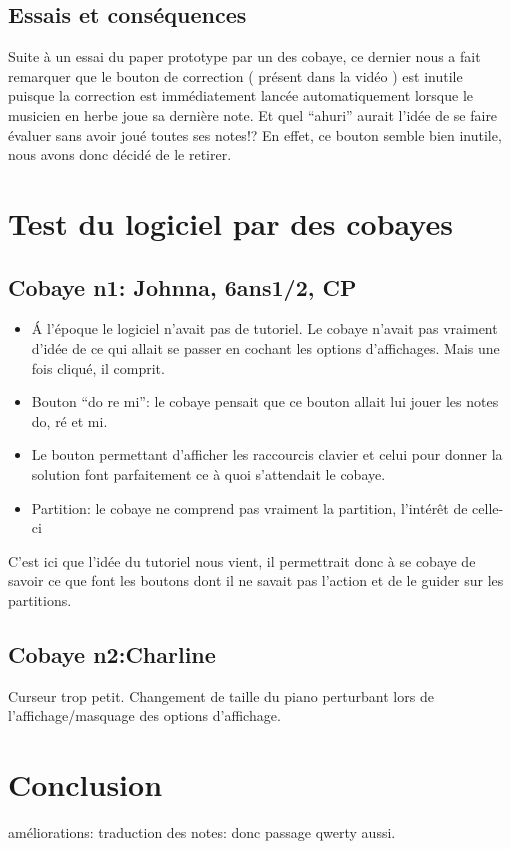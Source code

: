 \documentclass{article}
\begin{document}
\subsection{Essais et conséquences}
Suite à un essai du paper prototype par un des cobaye, ce dernier nous a fait remarquer que le bouton de correction ( présent dans la vidéo )
est inutile puisque la correction est immédiatement lancée automatiquement lorsque le musicien en herbe joue sa dernière note. Et 
quel ``ahuri'' aurait l'idée de se faire évaluer sans avoir joué toutes ses notes!?
En effet, ce bouton semble bien inutile, nous avons donc décidé de le retirer.
\section{Test du logiciel par des cobayes}
\subsection{Cobaye n1: Johnna, 6ans1/2, CP}

\begin{itemize}
\item \'A l'époque le logiciel n'avait pas de tutoriel. Le cobaye n'avait pas vraiment d'idée de ce qui allait se passer en cochant les 
options d'affichages. Mais une fois cliqué, il comprit.
\item Bouton ``do re mi'': le cobaye pensait que ce bouton allait lui jouer les notes do, ré et mi.
\item Le bouton permettant d'afficher les raccourcis clavier et celui pour donner la solution font parfaitement ce à quoi s'attendait
le cobaye.
\item Partition: le cobaye ne comprend pas vraiment la partition, l'intérêt de celle-ci
\end{itemize}

C'est ici que l'idée du tutoriel nous vient, il permettrait donc à se cobaye de savoir ce que font les boutons dont il ne savait pas
l'action et de le guider sur les partitions.

\subsection{Cobaye n2:Charline}

Curseur trop petit.
Changement de taille du piano perturbant lors de l'affichage/masquage des options d'affichage.


\section{Conclusion}
améliorations: traduction des notes: donc passage qwerty aussi.
\end{document}
